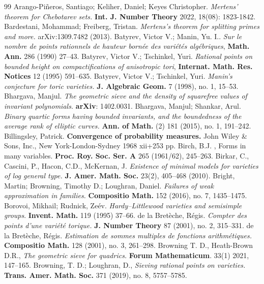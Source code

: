 \documentclass[11pt,letterpaper]{amsart}
\theoremstyle{plain}
\numberwithin{equation}{section}
\theoremstyle{definition}
\theoremstyle{remark}
\begin{document}
\begin{thebibliography}{99}
	 Arango-Piñeros, Santiago; Keliher, Daniel; Keyes Christopher. \emph{Mertens' theorem for Chebotarev sets.}  \textbf{Int. J. Number Theory} 2022, 18(08): 1823-1842.
	 Bardestani, Mohammad; Freiberg, Tristan. \emph{Mertens's theorem for splitting primes and more.} arXiv:1309.7482 (2013).
	 Batyrev, Victor V.; Manin, Yu. I.. \emph{Sur le nombre de points rationnels de hauteur born\'ee
	des vari\'et\'es alg\'ebriques}, \textbf{Math. Ann.} 286 (1990) 27--43.
	 Batyrev, Victor V.; Tschinkel, Yuri. \emph{Rational points on bounded height on compactifications of anisotropic tori}, \textbf{Internat. Math. Res. Notices} 12 (1995) 591--635.
	 Batyrev, Victor V.; Tschinkel, Yuri. \emph{Manin's conjecture for toric varieties.} \textbf{J. Algebraic Geom.} 7 (1998), no. 1, 15--53.
	  Bhargava, Manjul. \emph{The geometric sieve and the density of squarefree values of invariant polynomials.} \textbf{arXiv}: 1402.0031.
	 Bhargava, Manjul; Shankar, Arul. \emph{Binary quartic forms having bounded invariants, and the boundedness of the average rank of elliptic curves.} \textbf{Ann. of Math.} (2) 181 (2015), no. 1, 191--242.
	 Billingsley, Patrick. \textbf{Convergence of probability measures.} John Wiley \& Sons, Inc., New York-London-Sydney 1968 xii+253 pp.
	 Birch, B.J. , Forms in many variables. \textbf{Proc. Roy. Soc. Ser. A} 265 (1961/62), 245--263.
	 Birkar, C., Cascini, P., Hacon, C.D., McKernan, J. \emph{Existence of minimal models for varieties of log general type.} \textbf{J. Amer. Math. Soc.} 23(2), 405--468 (2010).
	 Bright, Martin; Browning, Timothy D.; Loughran, Daniel.
	\emph{Failures of weak approximation in families.} \textbf{Compositio Math.} 152 (2016), no. 7, 1435--1475.
	Borovoi, Mikhail; Rudnick, Zeév. \emph{Hardy--Littlewood varieties and semisimple groups}. \textbf{Invent. Math.} 119 (1995) 37--66.
	 de la Bretèche, Régis. \emph{Compter des points d'une variété torique.} \textbf{J. Number Theory} 87 (2001), no. 2, 315--331. 
	 de la Bretèche, Régis. \emph{Estimation de sommes multiples de fonctions arithmétiques.} \textbf{Compositio Math.} 128 (2001), no. 3, 261--298.
	 Browning T. D., Heath-Brown D.R., \emph{The geometric sieve for quadrics.} \textbf{Forum Mathematicum}. 33(1) 2021, 147--165.
	 Browning, T. D.; Loughran, D., \emph{Sieving rational points on varieties.} \textbf{Trans. Amer. Math. Soc.} 371 (2019), no. 8, 5757--5785.

\end{thebibliography}
\end{document}
